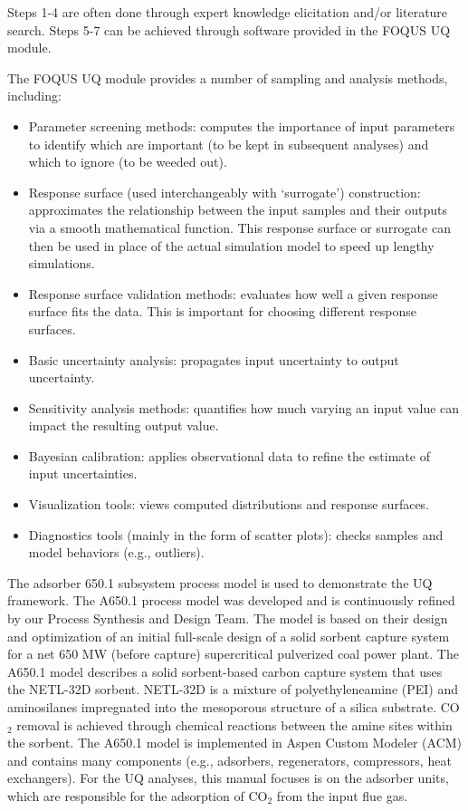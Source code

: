 Steps 1-4 are often done through expert knowledge elicitation and/or
literature search. Steps 5-7 can be achieved through software provided
in the FOQUS UQ module. 

The FOQUS UQ module provides a number of sampling and analysis methods, including:
\begin{itemize}
	\item Parameter screening methods: computes the importance of input
     parameters to identify which are important (to be kept in subsequent
     analyses) and which to ignore (to be weeded out).
	\item Response surface (used interchangeably with `surrogate')
     construction: approximates the relationship between the input samples
     and their outputs via a smooth mathematical function. This response
     surface or surrogate can then be used in place of the actual
     simulation model to speed up lengthy simulations.
	\item Response surface validation methods: evaluates how well a given
     response surface fits the data. This is important for choosing
     different response surfaces.
	\item Basic uncertainty analysis: propagates input uncertainty to output
     uncertainty.
	\item Sensitivity analysis methods: quantifies how much varying an input
     value can impact the resulting output value. 
	\item Bayesian calibration: applies observational data to refine the
     estimate of input uncertainties.
	\item Visualization tools: views computed distributions and response
     surfaces.
	\item Diagnostics tools (mainly in the form of scatter plots):
     checks samples and model behaviors (e.g., outliers).
\end{itemize}

The adsorber 650.1 subsystem process model is used to demonstrate the UQ
framework. The A650.1 process model was developed and is continuously
refined by our Process Synthesis and Design Team. The model is based on
their design and optimization of an initial full-scale design of a solid
sorbent capture system for a net 650 MW (before capture) supercritical
pulverized coal power plant. The A650.1 model describes a solid
sorbent-based carbon capture system that uses the NETL-32D
sorbent. NETL-32D is a mixture of polyethyleneamine (PEI) and aminosilanes
impregnated into the mesoporous structure of a silica substrate. CO$_2$
removal is achieved through chemical reactions between the amine sites
within the sorbent. The A650.1 model is implemented in Aspen Custom Modeler
(ACM) and contains many components (e.g., adsorbers, regenerators,
compressors, heat exchangers). For the UQ analyses, this manual focuses is on the adsorber units, which are responsible for the adsorption of
CO$_2$ from the input flue gas. 


